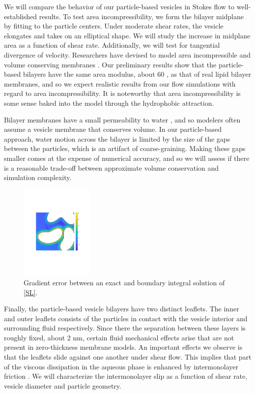 We will compare the behavior of our particle-based vesicles in Stokes flow to well-established results.
To test area incompressibility, we form the bilayer midplane by fitting to the particle centers. Under moderate shear rates,
the vesicle elongates and takes on an elliptical shape. We will study the increase in midplane area as a function of shear rate.
Additionally, we will test for tangential divergence of velocity.
Researchers have devised to model area incompressible and
volume conserving membranes
\cite{torres-sanchez_millan_arroyo_2019, mahapatra_saintillan_rangamani_2020, Steigmann99, C6SM02452A}.
Our preliminary results show that the particle-based bilayers have the same area modulus, about 60 \kBT,  as that of real lipid bilayer membranes,
and so we expect realistic results from our flow simulations with regard to area incompressibility.  It is noteworthy that
area incompressibility is some sense baked into the model through the hydrophobic attraction. 

Bilayer membranes have a small permeability to water \cite{323e9a2f0c58487ea82518d7a1f96485},
and so modelers often assume a vesicle membrane that conserves volume. In our particle-based approach, water motion across
the bilayer is limited by the size of the gaps between the particles, which is an artifact of coarse-graining.
Making these gaps smaller comes at the expense of numerical accuracy, and so we will assess if there is a reasonable trade-off
between approximate volume conservation and simulation complexity. 

\begin{figure}
\centerline{\includegraphics[width=0.32\textwidth]{figures/BIError.pdf}}
\caption{
\label{fig:bierror}  
  Gradient error between an exact and boundary integral solution of \eqref{SL}.
}
\end{figure}Finally, the particle-based vesicle bilayers have two distinct leaflets.
The inner and outer leaflets consists of the particles in contact with the vesicle interior and 
surrounding fluid respectively. Since there the separation between these layers is roughly fixed,
about 2 nm, certain fluid mechanical effects arise that are not present in zero-thickness membrane models. 
An important effects we observe is that the leaflets slide against one another under shear flow. 
This implies that part of the viscous dissipation in the aqueous phase is enhanced by intermonolayer friction
\cite{SHKULIPA2005823, ShkulipaThesis}. We will characterize the intermonolayer
slip as a function of shear rate, vesicle diameter and particle geometry. 

